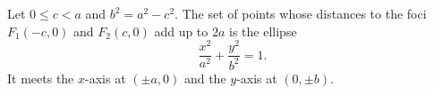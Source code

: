 \begin{theorem}\label{thm:ellipse-standard}
  Let $0 \leq c < a$ and $b^2 = a^2 - c^2$. The set of points whose distances
  to the foci $F_1(-c, 0)$ and $F_2(c, 0)$ add up to $2a$ is the ellipse
  \[
    \frac{x^2}{a^2} + \frac{y^2}{b^2} = 1.
  \]
  It meets the $x$-axis at $(\pm a, 0)$ and the $y$-axis at $(0, \pm b)$.
\end{theorem}
